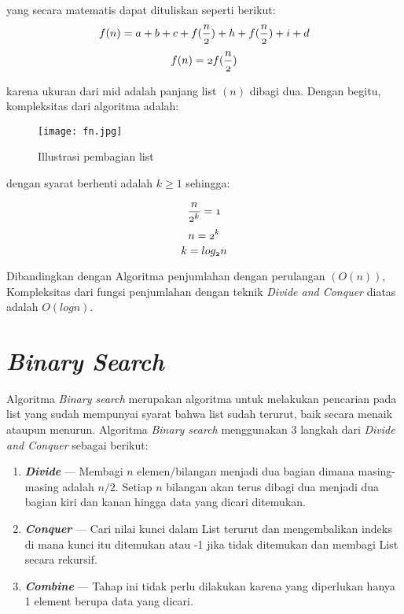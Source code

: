 \documentclass[12pt]{book}%
\begin{document}
yang secara matematis dapat dituliskan seperti berikut:
$$	  \mathnormal{f(n) = a+b+c+f(\frac{n}{2})+h+f(\frac{n}{2})+i+d } $$
$$	  \mathnormal{f(n) = 2f(\frac{n}{2})} $$

karena ukuran dari mid adalah panjang list $(n)$ dibagi dua. Dengan begitu, kompleksitas dari algoritma adalah:

\begin{figure}[htbp]
\begin{center}
	\texttt{[image: fn.jpg]}%
	\caption{Illustrasi pembagian list}%
	\label{fig:PembagianList}%
\end{center}
\end{figure}

dengan syarat berhenti adalah $k \geq 1$ sehingga:

$$	  \mathnormal{ \frac{n}{2^{k}}=1} $$
$$	  \mathnormal{n=2^{k}} $$
$$	  \mathnormal{k=log_{2}n} $$

Dibandingkan dengan Algoritma penjumlahan dengan perulangan $(O(n))$, Kompleksitas dari fungsi penjumlahan dengan teknik \textit{Divide and Conquer} diatas adalah $O(log n)$.

\section{\textit{Binary Search}}
Algoritma \textit{Binary search}  merupakan  algoritma untuk melakukan pencarian pada list yang sudah mempunyai syarat bahwa list sudah terurut, baik secara menaik ataupun menurun. Algoritma \textit{Binary search} menggunakan 3 langkah dari \textit{Divide and Conquer} sebagai berikut:
\begin{enumerate}
\item \textbf{\textit{Divide}} --- Membagi $n$ elemen/bilangan menjadi dua bagian dimana masing-masing adalah $n/2$. Setiap $n$ bilangan akan terus dibagi dua menjadi dua bagian kiri dan kanan hingga data yang dicari ditemukan.
\item \textbf{\textit{Conquer}} --- Cari nilai kunci dalam  List terurut dan mengembalikan indeks di mana kunci itu ditemukan atau -1 jika tidak ditemukan dan membagi List secara rekursif.
\item \textbf{\textit{Combine}} --- Tahap ini tidak perlu dilakukan karena yang diperlukan hanya 1 element berupa data yang dicari.
\end{enumerate}
\end{document}
